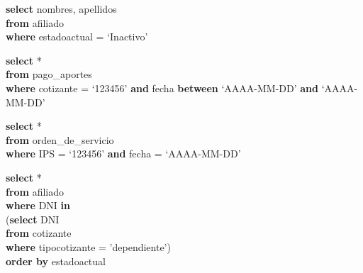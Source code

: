 \documentclass[12pt,a4paper]{article}
\begin{document}
\begin{tcolorbox}[title=Listado de afiliados inactivos]
\textbf{select} nombres, apellidos\\
\textbf{from} afiliado\\
\textbf{where} estadoactual = `Inactivo'
\end{tcolorbox}
\begin{tcolorbox}[title=Listado de aportes recibidos por un afiliado en un periodo de tiempo]
\textbf{select} *\\
\textbf{from} pago\_aportes\\
\textbf{where} cotizante = `123456' \textbf{and} fecha \textbf{between} `AAAA-MM-DD' \textbf{and} `AAAA-MM-DD'
\end{tcolorbox}
\begin{tcolorbox}[title=Listado de citas en una IPS y fecha particular]
\textbf{select} *\\
\textbf{from} orden\_de\_servicio\\
\textbf{where} IPS = `123456' \textbf{and} fecha = `AAAA-MM-DD'
\end{tcolorbox}
\begin{tcolorbox}[title=Listado de afiliados independientes organizados por estado]
\textbf{select} * \\
\textbf{from} afiliado\\ 
\textbf{where} DNI \textbf{in}\\
		(\textbf{select} DNI\\
		\textbf{from} cotizante\\
		\textbf{where} tipocotizante = 'dependiente')\\
		\textbf{order by} estadoactual
\end{tcolorbox}
\end{document}
